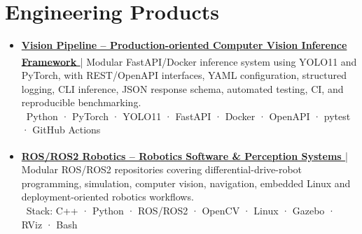 \documentclass[legalpaper,10pt]{article} %
\newcommand{\resumeSubHeadingListStart}{\begin{itemize}[leftmargin=0.0in, label={}]}
\newcommand{\resumeSubHeadingListEnd}{\end{itemize}}
\newcommand{\SkillIcon}{\textcolor{WhiteSmoke}{\faPuzzlePiece}} %
\newcommand{\ProductItem}[3]{
    \vspace{0pt}\justifying\item
    \textbf{\small#1} | {\footnotesize#2} \\
    {\footnotesize\quad\SkillIcon\ #3}
    \vspace{-7pt}
}
\newcommand{\ExternalLink}{\textcolor{maincolor}{\scriptsize\textsuperscript{\faExternalLink*}}}
\begin{document}
\section{Engineering Products}
\vspace{-4pt}
\resumeSubHeadingListStart
    \ProductItem{\href{https://edavila-drraccoon.github.io/vision_pipeline/}{Vision Pipeline -- Production-oriented Computer Vision Inference Framework \ExternalLink}}{Modular FastAPI/Docker inference system using YOLO11 and PyTorch, with REST/OpenAPI interfaces, YAML configuration, structured logging, CLI inference, JSON response schema, automated testing, CI, and reproducible benchmarking.}{Python · PyTorch · YOLO11 · FastAPI · Docker · OpenAPI · pytest · GitHub Actions}
    \ProductItem{\href{https://edavila-drraccoon.github.io/repo_ros2_course/}{ROS/ROS2 Robotics -- Robotics Software \& Perception Systems \ExternalLink}}{Modular ROS/ROS2 repositories covering differential-drive-robot programming, simulation, computer vision, navigation, embedded Linux and deployment-oriented robotics workflows.}{Stack: C++ · Python · ROS/ROS2 · OpenCV · Linux · Gazebo · RViz · Bash}
\resumeSubHeadingListEnd

\quad
\end{document}
